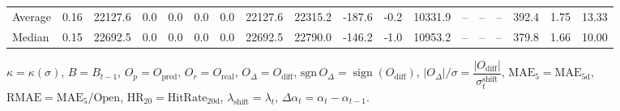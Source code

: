 \begin{threeparttable}
{\begin{tabular}{lrrrrrrrrrrrrrrrrr}
Average &     0.16 & 22127.6 &               0.0 &               0.0 &                0.0 &                0.0 & 22127.6 & 22315.2 &     -187.6 &                     -0.2 &             10331.9 &         -- &        -- &             -- &            392.4 &            1.75 &                  13.33 \\
 Median &     0.15 & 22692.5 &               0.0 &               0.0 &                0.0 &                0.0 & 22692.5 & 22790.0 &     -146.2 &                     -1.0 &             10953.2 &         -- &        -- &             -- &            379.8 &            1.66 &                  10.00 \\
\bottomrule
\end{tabular}
}
\begin{tablenotes}\footnotesize
\item $\kappa=\kappa(\sigma)$, $B=B_{t-1}$, $O_p=O_{\text{pred}}$, $O_r=O_{\text{real}}$, $O_\Delta=O_{\text{diff}}$, $\mathrm{sgn}\,O_\Delta=\operatorname{sign}(O_{\text{diff}})$, $|O_\Delta|/\sigma=\dfrac{|O_{\text{diff}}|}{\sigma_t^{\text{shift}}}$, $\mathrm{MAE}_5=\mathrm{MAE}_{5\text{d}}$, $\mathrm{RMAE}= \mathrm{MAE}_5 / \text{Open}$, $\mathrm{HR}_{20}=\mathrm{HitRate}_{20\text{d}}$, 
$\lambda_{\text{shift}}=\lambda_t$, 
$\Delta\alpha_t=\alpha_t-\alpha_{t-1}$.
\end{tablenotes}
\end{threeparttable}
\endgroup

